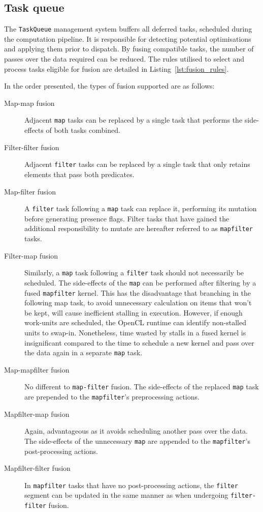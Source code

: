 \subsection{Task queue}
The \verb|TaskQueue| management system buffers all deferred tasks, scheduled during the computation pipeline. It is responsible for detecting potential optimisations and applying them prior to dispatch.
By fusing compatible tasks, the number of passes over the data required can be reduced. The rules utilised to select and process tasks eligible for fusion are detailed in Listing~\ref{lst:fusion_rules}.

In the order presented, the types of fusion supported are as follows:
\begin{description}
\item[Map-map fusion] Adjacent \verb|map| tasks can be replaced by a single task that performs the side-effects of both tasks combined.

\item[Filter-filter fusion] Adjacent \verb|filter| tasks can be replaced by a single task that only retains elements that pass both predicates.

\item[Map-filter fusion] A \verb|filter| task following a \verb|map| task can replace it, performing its mutation before generating presence flags. Filter tasks that have gained the additional responsibility to mutate are hereafter referred to as \verb|mapfilter| tasks.

\item[Filter-map fusion] Similarly, a \verb|map| task following a \verb|filter| task should not necessarily be scheduled. The side-effects of the \verb|map| can be performed after filtering by a fused \verb|mapfilter| kernel. This has the disadvantage that branching in the following map task, to avoid unnecessary calculation on items that won't be kept, will cause inefficient stalling in execution. However, if enough work-units are scheduled, the \ac{OpenCL} runtime can identify non-stalled units to swap-in. Nonetheless, time wasted by stalls in a fused kernel is insignificant compared to the time to schedule a new kernel and pass over the data again in a separate \verb|map| task.

\item[Map-mapfilter fusion] No different to \verb|map-filter| fusion. The side-effects of the replaced \verb|map| task are prepended to the \verb|mapfilter|'s preprocessing actions.

\item[Mapfilter-map fusion] Again, advantageous as it avoids scheduling another pass over the data. The side-effects of the unnecessary \verb|map| are appended to the \verb|mapfilter|'s post-processing actions.

\item[Mapfilter-filter fusion] In \verb|mapfilter| tasks that have no post-processing actions, the \verb|filter| segment can be updated in the same manner as when undergoing \verb|filter-filter| fusion.
\end{description}

